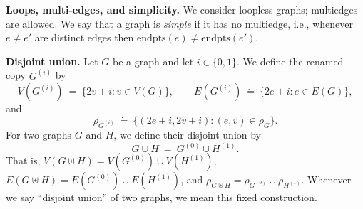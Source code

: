\documentclass[11pt,a4paper]{article}
\newcommand{\agraph}{G}
\newcommand{\bgraph}{H}
\newcommand{\N}{\mathbb{N}}
\newcommand{\vertexset}[1]{V(#1)}
\newcommand{\edgeset}[1]{E(#1)}
\newcommand{\incidencerelationname}{\rho}
\newcommand{\incidencerelation}[1]{\incidencerelationname_{#1}}
\newcommand{\edgeendpointsname}{\mathrm{endpts}}
\newcommand{\anedge}{e}
\newcommand{\avertex}{v}
\newcommand{\defeq}{~\dot{=}~}
\newcommand{\allgraphs}{\textsc{Graphs}}
\newcommand{\vertexsetname}{V}
\newcommand{\edgesetname}{E}
\begin{document}
\par\medskip\noindent\textbf{Loops, multi-edges, and simplicity.}
We consider loopless graphs; multiedges are allowed.
We say that a graph is \emph{simple} if it has no multiedge, i.e., whenever $e\neq e'$ are distinct edges then $\edgeendpointsname(e)\neq \edgeendpointsname(e')$.

\par\medskip\noindent\textbf{Disjoint union.}
Let $\agraph$ be a graph and let $i\in\{0,1\}$. We define the renamed copy $\agraph^{(i)}$ by
\[
\vertexset{\agraph^{(i)}} \defeq \{2v+i : v\in \vertexset{\agraph}\},\qquad
\edgeset{\agraph^{(i)}} \defeq \{2e+i : e\in \edgeset{\agraph}\},
\]
and
\[
\incidencerelation{\agraph^{(i)}} \defeq \{(2e+i,2v+i) : (e,v)\in \incidencerelation{\agraph}\}.
\]
For two graphs $\agraph$ and $\bgraph$, we define their disjoint union by
\[
\agraph \uplus \bgraph \defeq \agraph^{(0)} \cup \bgraph^{(1)}.
\]
That is, $\vertexset{\agraph\uplus\bgraph}=\vertexset{\agraph^{(0)}}\cup \vertexset{\bgraph^{(1)}}$,
$\edgeset{\agraph\uplus\bgraph}=\edgeset{\agraph^{(0)}}\cup \edgeset{\bgraph^{(1)}}$, and
$\incidencerelation{\agraph\uplus\bgraph}=\incidencerelation{\agraph^{(0)}}\cup \incidencerelation{\bgraph^{(1)}}$.
Whenever we say ``disjoint union'' of two graphs, we mean this fixed construction.

\end{document}

